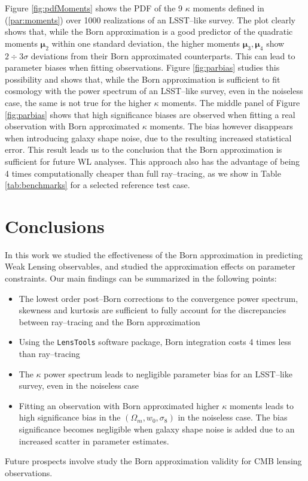 \documentclass[reprint,aps,prd,superscriptaddress,showkeys,showpacs]{revtex4-1}
\newcommand{\ttt}[1]{\texttt{#1}}
\begin{document}
Figure \ref{fig:pdfMoments} shows the PDF of the 9 $\kappa$ moments defined in (\ref{par:moments}) over 1000 realizations of an LSST--like survey. The plot clearly shows that, while the Born approximation is a good predictor of the quadratic moments $\pmb{\mu}_2$ within one standard deviation, the higher moments $\pmb{\mu}_3,\pmb{\mu}_4$ show $2\div 3\sigma$ deviations from their Born approximated counterparts. This can lead to parameter biases when fitting observations. Figure \ref{fig:parbias} studies this possibility and shows that, while the Born approximation is sufficient to fit cosmology with the power spectrum of an LSST--like survey, even in the noiseless case, the same is not true for the higher $\kappa$ moments. The middle panel of Figure \ref{fig:parbias} shows that high significance biases are observed when fitting a real observation with Born approximated $\kappa$ moments. The bias however disappears when introducing galaxy shape noise, due to the resulting increased statistical error. This result leads us to the conclusion that the Born approximation is sufficient for future WL analyses. This approach also has the advantage of being 4 times computationally cheaper than full ray--tracing, as we show in Table \ref{tab:benchmarks} for a selected reference test case.  


\section{Conclusions}
In this work we studied the effectiveness of the Born approximation in predicting Weak Lensing observables, and studied the approximation effects on parameter constraints. Our main findings can be summarized in the following points:

\begin{itemize}
\item The lowest order post--Born corrections to the convergence power spectrum, skewness and kurtosis are sufficient to fully account for the discrepancies between ray--tracing and the Born approximation
\item Using the \ttt{LensTools} software package, Born integration costs 4 times less than ray--tracing 
\item The $\kappa$ power spectrum leads to negligible parameter bias for an LSST--like survey, even in the noiseless case
\item Fitting an observation with Born approximated higher $\kappa$ moments leads to high significance bias in the $(\Omega_m,w_0,\sigma_8)$ in the noiseless case. The bias significance becomes negligible when galaxy shape noise is added due to an increased scatter in parameter estimates.   
\end{itemize}
%
Future prospects involve study the Born approximation validity for CMB lensing observations. 
\end{document}
